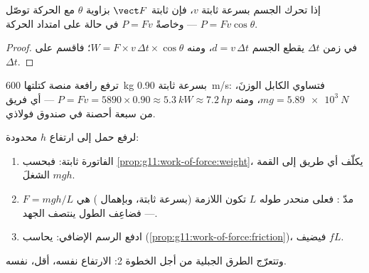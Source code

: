 \begin{proposition}\label{prop:g11:work-of-force:pfv}
إذا تحرك الجسم بسرعة ثابتة $v$، فإن  ثابتة $\vect F$
بزاوية $\theta$ مع الحركة توصّل 
$P = F v \cos\theta$ --- وخاصةً $P = Fv$ في حالة  على امتداد
الحركة.
\end{proposition}

\begin{proof}
في زمن $\Delta t$ يقطع الجسم $d = v\,\Delta t$، ومنه
$W = F \times v\,\Delta t \times \cos\theta$؛ فاقسم على $\Delta t$.
\end{proof}

\begin{example}[رافعة]\label{ex:g11:work-of-force:crane}
ترفع رافعة منصة كتلتها \qty{600}{kg} بسرعة ثابتة \qty{0.90}{m/s}: فتساوي
 الكابل الوزنَ، $mg = \qty{5.89e3}{N}$، ومنه
$P = Fv = 5890 \times 0.90 \approx \qty{5.3}{kW} \approx \qty{7.2}{hp}$
--- أي فريق من سبعة أحصنة في صندوق فولاذي.
\end{example}

\begin{method}\label{met:g11:work-of-force:zigzag}
لرفع حمل إلى ارتفاع $h$  محدودة:
\begin{enumerate}
  \item الفاتورة ثابتة: فبحسب \cref{prop:g11:work-of-force:weight}،
        يكلّف أي طريق إلى القمة الشغلَ $mgh$.
  \item مدّ : فعلى منحدر طوله $L$ تكون  اللازمة
        (بسرعة ثابتة، وبإهمال ) هي $F = mgh/L$ --- فضاعِف
        الطول ينتصف الجهد.
  \item ادفع الرسم الإضافي:  يحاسب 
        (\cref{prop:g11:work-of-force:friction})، فيضيف $fL$.
\end{enumerate}
وتتعرّج الطرق الجبلية من أجل الخطوة 2: الارتفاع نفسه،  أقل،  نفسه.
\end{method}

